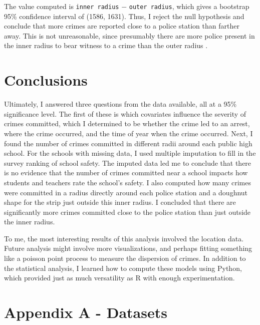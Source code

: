 \documentclass[11pt]{article}
\newcommand{\1}{\mathds{1}}
\def\code#1{\texttt{#1}}
\begin{document}
The value computed is \code{inner radius} $-$ \code{outer radius}, which gives a bootstrap 95\% confidence interval of (1586, 1631). Thus, I reject the null hypothesis and conclude that more crimes are reported close to a police station than farther away. This is not unreasonable, since presumably there are more police present in the inner radius to bear witness to a crime than the outer radius .


\section{Conclusions}

Ultimately, I answered three questions from the data available, all at a 95\% significance level. The first of these is which covariates influence the severity of crimes committed, which I determined to be whether the crime led to an arrest, where the crime occurred, and the time of year when the crime occurred. Next, I found the number of crimes committed in different radii around each public high school. For the schools with missing data, I used multiple imputation to fill in the survey ranking of school safety. The imputed data led me to conclude that there is no evidence that the number of crimes committed near a school impacts how students and teachers rate the school's safety. I also computed how many crimes were committed in a radius directly around each police station and a doughnut shape for the strip just outside this inner radius. I concluded that there are significantly more crimes committed close to the police station than just outside the inner radius.

To me, the most interesting results of this analysis involved the location data. Future analysis might involve more visualizations, and perhaps fitting something like a poisson point process to measure the dispersion of crimes. In addition to the statistical analysis, I learned how to compute these models using Python, which provided just as much versatility as R with enough experimentation.


\section*{Appendix A - Datasets}
\end{document}
